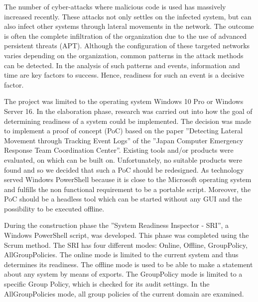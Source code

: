 
\thispagestyle{plain}
\renewcommand\section{\stdsection}
The number of cyber-attacks where malicious code is used has massively increased recently. These attacks not only settles on the infected system, but can also infect other systems through lateral movements in the network. The outcome is often the complete infiltration of the organization due to the use of advanced persistent threats (APT). Although the configuration of these targeted networks varies depending on the organization, common patterns in the attack methods can be detected. In the analysis of such patterns and events, information and time are key factors to success. Hence, readiness for such an event is a decisive factor.

The project was limited to the operating system Windows 10 Pro or Windows Server 16. In the elaboration phase, research was carried out into how the goal of determining readiness of a system could be implemented. The decision was made to implement a proof of concept (PoC) based on the paper ''Detecting Lateral Movement through Tracking Event Logs'' of the ''Japan Computer Emergency Response Team Coordination Center''. Existing tools and/or products were evaluated, on which can be built on. Unfortunately, no suitable products were found and so we decided that such a PoC should be redesigned. As technology served Windows PowerShell because it is close to the Microsoft operating system and fulfills the non functional requirement to be a portable script. Moreover, the PoC should be a headless tool which can be started without any GUI and the possibility to be executed offline.


During the construction phase the ''System Readiness Inspector - SRI'', a Windows PowerShell script, was developed. This phase was completed using the Scrum method. The SRI has four different modes: Online, Offline, GroupPolicy, AllGroupPolicies. The online mode is limited to the current system and thus determines its readiness. The offline mode is used to be able to make a statement about any system by means of exports. The GroupPolicy mode is limited to a specific Group Policy, which is checked for its audit settings. In the AllGroupPolicies mode, all group policies of the current domain are examined. 
\thispagestyle{plain}